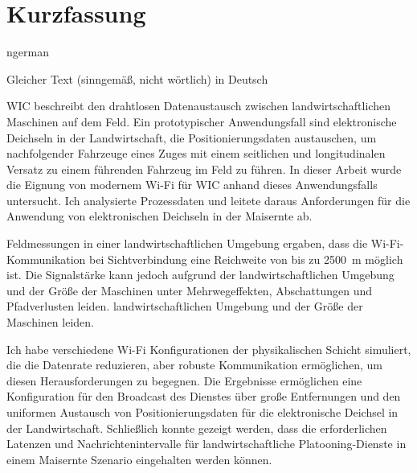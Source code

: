 \chapter*{Kurzfassung}
\begin{otherlanguage*}{ngerman}

Gleicher Text (sinngemäß, nicht wörtlich) in Deutsch

\end{otherlanguage*}
\acresetall


\ac{WIC} beschreibt den drahtlosen Datenaustausch zwischen landwirtschaftlichen Maschinen auf dem Feld.
Ein prototypischer Anwendungsfall sind elektronische Deichseln in der Landwirtschaft, die Positionierungsdaten austauschen, um nachfolgender
Fahrzeuge eines Zuges mit einem seitlichen und longitudinalen Versatz zu einem führenden Fahrzeug im Feld zu führen.
In dieser Arbeit wurde die Eignung von modernem Wi-Fi für \ac{WIC} anhand dieses Anwendungsfalls untersucht.
Ich analysierte Prozessdaten und leitete daraus Anforderungen für die Anwendung von elektronischen Deichseln in der Maisernte ab.

Feldmessungen in einer landwirtschaftlichen Umgebung ergaben, dass die Wi-Fi-Kommunikation bei Sichtverbindung eine Reichweite von bis zu \SI{2500}{\metre}
möglich ist.
Die Signalstärke kann jedoch aufgrund der landwirtschaftlichen Umgebung und der Größe der Maschinen unter Mehrwegeffekten, Abschattungen und Pfadverlusten leiden.
landwirtschaftlichen Umgebung und der Größe der Maschinen leiden.

Ich habe verschiedene Wi-Fi Konfigurationen der physikalischen Schicht simuliert, die die Datenrate reduzieren, aber
robuste Kommunikation ermöglichen, um diesen Herausforderungen zu begegnen.
Die Ergebnisse ermöglichen eine Konfiguration für den Broadcast des Dienstes über große Entfernungen und den uniformen Austausch von
Positionierungsdaten für die elektronische Deichsel in der Landwirtschaft.
Schließlich konnte gezeigt werden, dass die erforderlichen Latenzen und Nachrichtenintervalle für landwirtschaftliche Platooning-Dienste in einem Maisernte
Szenario eingehalten werden können.

\cleardoublepage